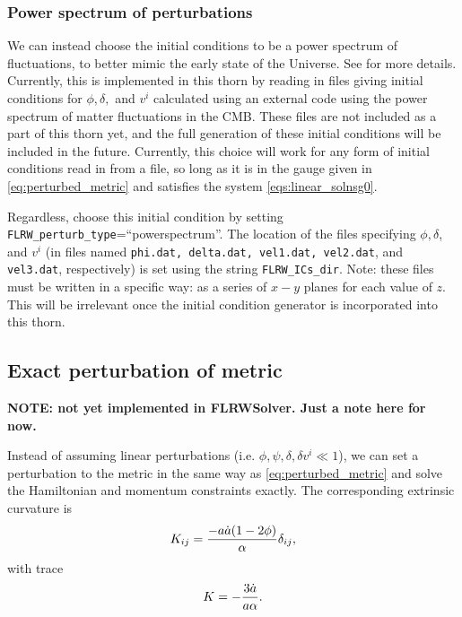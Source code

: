 \subsubsection{Power spectrum of perturbations}

We can instead choose the initial conditions to be a power spectrum of fluctuations, to better mimic the early state of the Universe. See \cite{macpherson2019} for more details. Currently, this is implemented in this thorn by reading in files giving initial conditions for $\phi, \delta,$ and $v^i$ calculated using an external code using the power spectrum of matter fluctuations in the CMB. These files are not included as a part of this thorn yet, and the full generation of these initial conditions will be included in the future. Currently, this choice will work for any form of initial conditions read in from a file, so long as it is in the gauge given in \eqref{eq:perturbed_metric} and satisfies the system \eqref{eqs:linear_solnsg0}. 

Regardless, choose this initial condition by setting \texttt{FLRW\_perturb\_type}=``powerspectrum''. The location of the files specifying $\phi, \delta$, and $v^i$ (in files named {\tt phi.dat, delta.dat, vel1.dat, vel2.dat}, and {\tt vel3.dat}, respectively) is set using the string {\tt FLRW\_ICs\_dir}. Note: these files must be written in a specific way: as a series of $x-y$ planes for each value of $z$. This will be irrelevant once the initial condition generator is incorporated into this thorn. 


\subsection{Exact perturbation of metric}

{\bf NOTE: not yet implemented in FLRWSolver. Just a note here for now.}

Instead of assuming linear perturbations (i.e. $\phi,\psi,\delta,\delta v^i \ll 1$), we can set a perturbation to the metric in the same way as \eqref{eq:perturbed_metric} and solve the Hamiltonian and momentum constraints exactly. The corresponding extrinsic curvature is
\begin{equation}
	K_{ij} = \frac{-a\dot{a}(1-2\phi)}{\alpha} \delta_{ij},
\end{equation}
with trace
\begin{equation}
	K = - \frac{3\dot{a}}{a\alpha}.
\end{equation}

